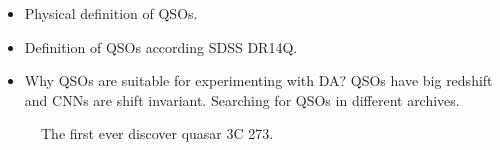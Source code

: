 \begin{itemize}
	\item Physical definition of QSOs.
	\item Definition of QSOs according SDSS DR14Q.
	\item Why QSOs are suitable for experimenting with DA?
		QSOs have big redshift and CNNs are shift invariant.
		Searching for QSOs in different archives.
\end{itemize}

\begin{figure}
\begin{center}
\end{center}
\caption{
The first ever discover quasar 3C 273.
}
\label{3c_273}
\end{figure}

